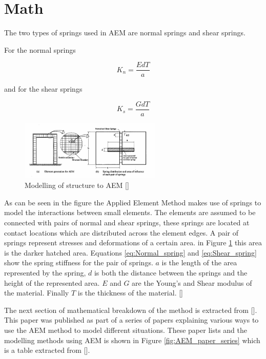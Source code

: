\section{Math}

The two types of springs used in AEM are normal springs and shear springs.

For the normal springs 

\begin{equation}
K_n = \frac{E d T}{a}
\label{eq:Normal_spring}
\end{equation}

and for the shear springs

\begin{equation}
K_s = \frac{G d T}{a}
\label{eq:Shear_spring}
\end{equation}

\begin{figure}[H]
\centering
\includegraphics[width=0.6\textwidth]{../Modelling_anatomy.png}
\caption{Modelling of structure to AEM [\cite{First_AEM}]}
\label{fig:Modelling_anatomy}
\end{figure}

As can be seen in the figure the Applied Element Method makes use of springs to model the interactions between small elements.  The elements are assumed to be connected with pairs of normal and shear springs, these springs are located at contact locations which are distributed across the element edges. 
A pair of springs represent stresses and deformations of a certain area.  in Figure \ref{fig:Modelling_anatomy} this area is the darker hatched area.  Equations \ref{eq:Normal_spring} and \ref{eq:Shear_spring} show the spring stiffness for the pair of springs. $a$ is the length of the area represented by the spring, $d$ is both the distance between the springs and the height of the represented area. $E$ and $G$ are the Young's and Shear modulus of the material.  Finally $T$ is the thickness of the material. [\cite{First_AEM}]

The next section of mathematical breakdown of the method is extracted from [\cite{First_AEM}].  This paper was published as part of a series of papers explaining various ways to use the AEM method to model different situations.  These paper lists and the modelling methods using AEM is shown in Figure \ref{fig:AEM_paper_series} which is a table extracted from [\cite{First_AEM}].

